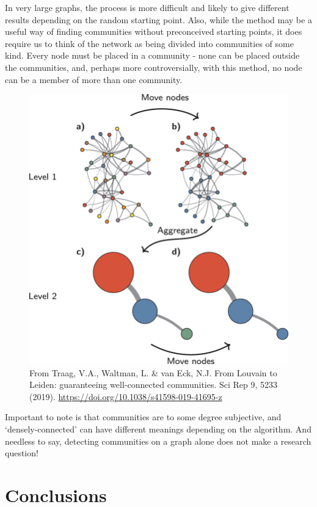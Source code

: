 \documentclass[
]{book}
\begin{document}
In very large graphs, the process is more difficult and likely to give different results depending on the random starting point. Also, while the method may be a useful way of finding communities without preconceived starting points, it does require us to think of the network as being divided into communities of some kind. Every node must be placed in a community - none can be placed outside the communities, and, perhaps more controversially, with this method, no node can be a member of more than one community.~

\begin{figure}
\centering
\includegraphics[width=7.29167in,height=\textheight]{images/louvain.png}
\caption{From Traag, V.A., Waltman, L. \& van Eck, N.J. From Louvain to Leiden: guaranteeing well-connected communities. Sci Rep 9, 5233 (2019). \url{https://doi.org/10.1038/s41598-019-41695-z}}
\end{figure}

Important to note is that communities are to some degree subjective, and `densely-connected' can have different meanings depending on the algorithm. And needless to say, detecting communities on a graph alone does not make a research question!

\hypertarget{conclusions}{%
\section{Conclusions}\label{conclusions}}
\end{document}
